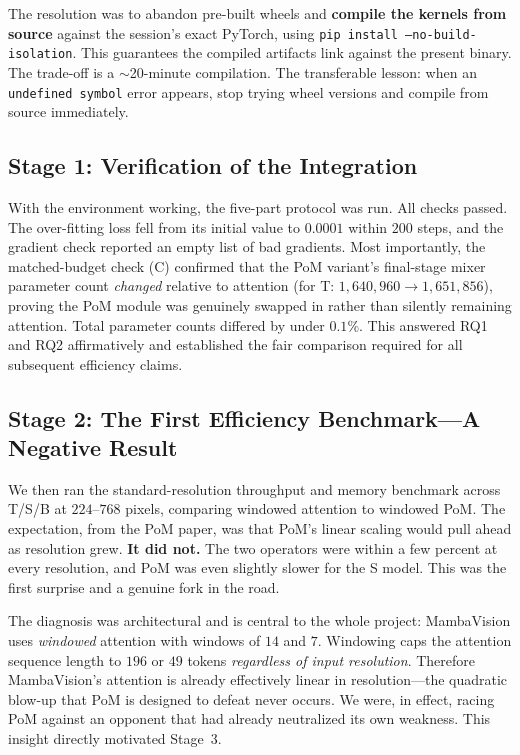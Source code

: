 \documentclass[11pt,a4paper]{article}
\begin{document}
The resolution was to abandon pre-built wheels and \textbf{compile the kernels from source} against the session's exact PyTorch, using \texttt{pip install --no-build-isolation}. This guarantees the compiled artifacts link against the present binary. The trade-off is a $\sim$20-minute compilation. The transferable lesson: when an \texttt{undefined symbol} error appears, stop trying wheel versions and compile from source immediately.

\subsection{Stage 1: Verification of the Integration}

With the environment working, the five-part protocol was run. All checks passed. The over-fitting loss fell from its initial value to $0.0001$ within $200$ steps, and the gradient check reported an empty list of bad gradients. Most importantly, the matched-budget check (C) confirmed that the PoM variant's final-stage mixer parameter count \emph{changed} relative to attention (for T: $1{,}640{,}960 \to 1{,}651{,}856$), proving the PoM module was genuinely swapped in rather than silently remaining attention. Total parameter counts differed by under $0.1\%$. This answered RQ1 and RQ2 affirmatively and established the fair comparison required for all subsequent efficiency claims.

\subsection{Stage 2: The First Efficiency Benchmark---A Negative Result}

We then ran the standard-resolution throughput and memory benchmark across T/S/B at $224$--$768$ pixels, comparing windowed attention to windowed PoM. The expectation, from the PoM paper, was that PoM's linear scaling would pull ahead as resolution grew. \textbf{It did not.} The two operators were within a few percent at every resolution, and PoM was even slightly slower for the S model. This was the first surprise and a genuine fork in the road.

The diagnosis was architectural and is central to the whole project: MambaVision uses \emph{windowed} attention with windows of $14$ and $7$. Windowing caps the attention sequence length to $196$ or $49$ tokens \emph{regardless of input resolution}. Therefore MambaVision's attention is already effectively linear in resolution---the quadratic blow-up that PoM is designed to defeat never occurs. We were, in effect, racing PoM against an opponent that had already neutralized its own weakness. This insight directly motivated Stage~3.
\end{document}
